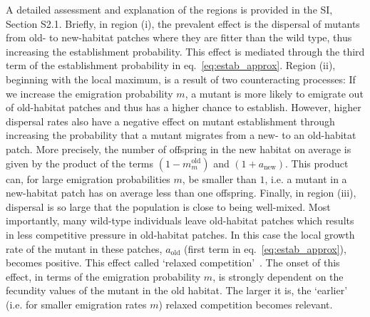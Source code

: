 \documentclass[a4paper,11pt]{article}
\newcommand{\chg}[1]{\textcolor{change}{#1}}
\begin{document}
A detailed assessment and explanation of the regions is provided in the SI, Section S2.1. Briefly, in region (i), the prevalent effect is the dispersal of mutants from old- to new-habitat patches where they are fitter than the wild type, thus increasing the establishment probability. This effect is mediated through the third term of the establishment probability in eq.~\eqref{eq:estab_approx}. 
Region (ii), beginning with the local maximum, is a result of two counteracting processes: %
\chg{If we increase the emigration probability $m$, a mutant is more likely to emigrate out of old-habitat patches and thus has a higher chance to establish. However, higher dispersal rates also have a negative effect on mutant establishment through \linelabel{R2-32}increasing the probability that a mutant migrates from a new- to an old-habitat patch. More precisely, the number of offspring in the new habitat on average is given by the product of the terms $(1-m_m^{\text{old}})$ and $(1+a_{\text{new}})$. This product can, for large emigration probabilities $m$, be smaller than $1$, i.e. a mutant in a new-habitat patch has on average less than one offspring. Finally, in region (iii), dispersal is so large that the population is close to being well-mixed. Most importantly, many wild-type individuals leave old-habitat patches which results in less competitive pressure in old-habitat patches. In this case the local growth rate of the mutant in these patches, $a_{\text{old}}$ (first term in eq.~\eqref{eq:estab_approx}), becomes positive. This effect called `relaxed competition'~\citep{uecker_2014}. The onset of this effect, in terms of the emigration probability $m$, is strongly dependent on the fecundity values of the mutant in the old habitat. The larger it is, the `earlier' (i.e. for smaller emigration rates $m$) relaxed competition becomes relevant.} 


 
\end{document}
